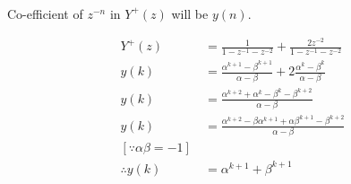 \documentclass[journal,12pt,twocolumn]{IEEEtran}
\renewcommand\thesection{\arabic{section}}
\begin{document}
\begin{enumerate}[label=\thesection.\arabic*,ref=\thesection.\theenumi]
	\solution\\
		Co-efficient of $z^{-n}$ in $Y^+(z)$ will be $y(n)$.

		\begin{align}
			Y^+(z) & = \frac{1}{1-z^{-1}-z^{-2}} + \frac{2z^{-2}}{1-z^{-1}-z^{-2}}\\
			y(k) & = \frac{\alpha^{k+1} - \beta^{k+1}}{\alpha - \beta} + 2\frac{\alpha^{k} - \beta^{k}}{\alpha - \beta}\\
			y(k) & = \frac{\alpha^{k+2} + \alpha^k - \beta^k - \beta^{k+2}}{\alpha - \beta}\\
			y(k) & = \frac{\alpha^{k+2} - \beta\alpha^{k+1} + \alpha\beta^{k+1} - \beta^{k+2}}{\alpha - \beta}\\
			[\because \alpha\beta = -1]\ & \nonumber\\
			\therefore y(k) & = \alpha^{k+1} + \beta^{k+1}
		\end{align}

\end{enumerate}
\end{document}
